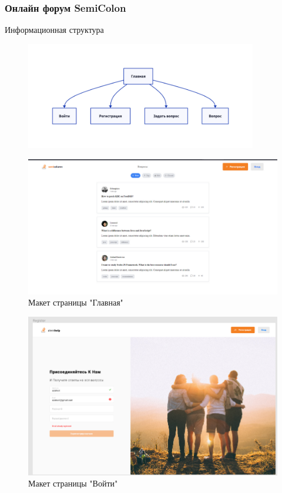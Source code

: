 \documentclass[aspectratio=169]{beamer}
\begin{document}
\begin{frame}
  \frametitle{Онлайн форум SemiColon}
  
\begin{center}
    \huge{Информационная структура}
  \end{center}
  \begin{figure}
    \centering
    \includegraphics[width=0.9\textwidth]{assets/struct.png}
  \end{figure}
\end{frame}
\begin{frame}
  \begin{figure}
    \centering
    \includegraphics[width=1\textwidth]{assets/mainpage.png}
    \caption{Макет страницы "Главная"}
  \end{figure}
\end{frame}
\begin{frame}
  \begin{figure}
    \centering
    \includegraphics[width=1\textwidth]{assets/login.png}
    \caption{Макет страницы "Войти"}
  \end{figure}
\end{frame}
\end{document}
